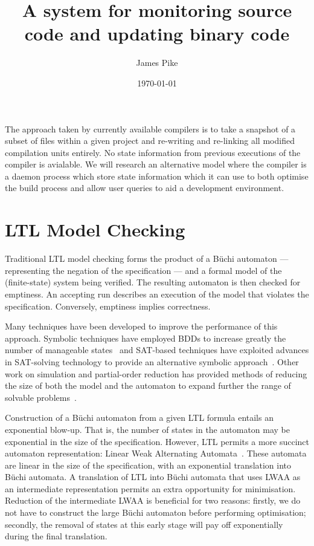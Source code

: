 \documentclass{article}
\begin{document}
\title{A system for monitoring source code and updating binary code}
\author{James Pike}
\date{\today}

\maketitle

The approach taken by currently available compilers is to take a snapshot
of a subset of files within a given project and re-writing and re-linking all
modified compilation units entirely. No state information from previous
executions of the compiler is avialable. We will research an alternative model where the compiler
is a daemon process which store state information which it can use to 
both optimise the build process and allow user queries to aid a development
environment.

\section{LTL Model Checking}

Traditional LTL model checking forms the product of a B\"uchi
automaton --- representing the negation of the specification --- and a
formal model of the (finite-state) system being verified.  The
resulting automaton is then checked for emptiness.  An accepting run
describes an execution of the model that violates the specification.
Conversely, emptiness implies correctness.

Many techniques have been developed to improve the performance of this
approach.  Symbolic techniques have employed BDDs to increase greatly
the number of manageable states~\cite{BCMDH90} and SAT-based techniques
have exploited advances in SAT-solving technology to provide an
alternative symbolic approach~\cite{BCCZ99}.  Other work on simulation
and partial-order reduction has provided methods of reducing the size
of both the model and the automaton to expand further the range of
solvable problems~\cite{P98,EWS01}.

Construction of a B\"uchi automaton from a given LTL formula entails
an exponential blow-up.  That is, the number of states in the
automaton may be exponential in the size of the specification.
However, LTL permits a more succinct automaton representation: Linear
Weak Alternating Automata~\cite{MSS88}.  These automata are linear in
the size of the specification, with an exponential translation into
B\"uchi automata.  A translation of LTL into B\"uchi automata
that uses LWAA as an intermediate representation permits an extra
opportunity for minimisation.  Reduction of the intermediate LWAA is
beneficial for two reasons: firstly, we do not have to construct the
large B\"uchi automaton before performing optimisation; secondly, the
removal of states at this early stage will pay off exponentially
during the final translation.
\end{document}
